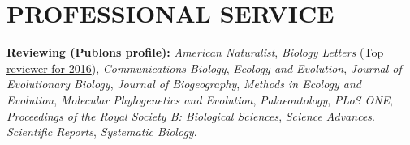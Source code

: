 \documentclass[10pt,a4paper]{article}
\begin{document}
{%


\bigskip


\section{PROFESSIONAL SERVICE}
\raggedright\textbf{Reviewing (\href{https://publons.com/author/640901/thomas-guillerme}{Publons profile}):}
\textit{American Naturalist},
\textit{Biology Letters} (\href{http://blogs.royalsociety.org/publishing/biology-letters-top-reviewers-from-2016/}{Top reviewer for 2016}),
\textit{Communications Biology},
\textit{Ecology and Evolution},
\textit{Journal of Evolutionary Biology},
\textit{Journal of Biogeography},
\textit{Methods in Ecology and Evolution},
\textit{Molecular Phylogenetics and Evolution},
\textit{Palaeontology},
\textit{PLoS ONE},
\textit{Proceedings of the Royal Society B: Biological Sciences},
\textit{Science Advances}.
\textit{Scientific Reports},
\textit{Systematic Biology}.

}
\end{document}
